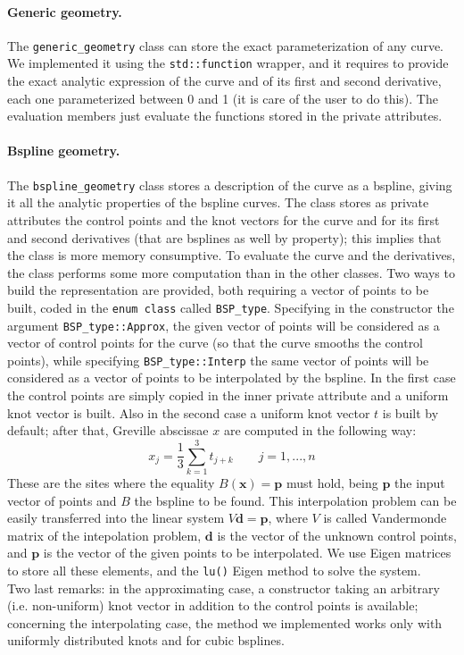 \documentclass[10pt]{article} %
\newcommand{\classname}[1]{\texttt{#1}}
\begin{document}
	\paragraph{Generic geometry.} The \classname{generic\_geometry} class can store the exact parameterization of any curve. We implemented it using the \texttt{std::function} wrapper, and it requires to provide the exact analytic expression of the curve and of its first and second derivative, each one parameterized between 0 and 1 (it is care of the user to do this). The evaluation members just evaluate the functions stored in the private attributes.
	\paragraph{Bspline geometry.} The \classname{bspline\_geometry} class stores a description of the curve as a bspline, giving it all the analytic properties of the bspline curves. The class stores as private attributes the control points and the knot vectors for the curve and for its first and second derivatives (that are bsplines as well by property); this implies that the class is more memory consumptive. To evaluate the curve and the derivatives, the class performs some more computation than in the other classes. \newline	
	Two ways to build the representation are provided, both requiring a vector of points to be built, coded in the \texttt{enum class} called \texttt{BSP\_type}. Specifying in the constructor the argument \texttt{BSP\_type::Approx}, the given vector of points will be considered as a vector of control points for the curve (so that the curve smooths the control points), while specifying \texttt{BSP\_type::Interp} the same vector of points will be considered as a vector of points to be interpolated by the bspline. In the first case the control points are simply copied in the inner private attribute and a uniform knot vector is built. 
	Also in the second case a uniform knot vector $t$ is built by default; after that, Greville abscissae $x$ are computed in the following way:
	\begin{equation*}
		x_{j} = \frac{1}{3} \sum_{k=1}^3 t_{j+k} \qquad j=1,...,n 
	\end{equation*} 
	These are the sites where the equality $B(\mathbf{x})=\mathbf{p}$ must hold, being $\mathbf{p}$ the input vector of points and $B$ the bspline to be found.
	This interpolation problem can be easily transferred into the linear system $V \mathbf{d} = \mathbf{p}$, where $V$ is called Vandermonde matrix of the intepolation problem, $\mathbf{d}$ is the vector of the unknown control points, and $\mathbf{p}$ is the vector of the given points to be interpolated. We use Eigen matrices to store all these elements, and the \texttt{lu()} Eigen method to solve the system. \\
	Two last remarks: in the approximating case, a constructor taking an arbitrary (i.e. non-uniform) knot vector in addition to the control points is available; concerning the interpolating case, the method we implemented works only with uniformly distributed knots and for cubic bsplines.
	
\end{document}

